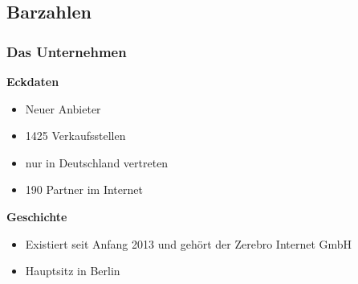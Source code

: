 \subsection{Barzahlen}
\subsubsection{Das Unternehmen}

\textbf{Eckdaten}
\begin{itemize}
\item Neuer Anbieter
\item 1425 Verkaufsstellen
\item nur in Deutschland vertreten
\item 190 Partner im Internet
\end{itemize}
%
%
\textbf{Geschichte}
\begin{itemize}
\item Existiert seit Anfang 2013 und gehört der Zerebro Internet GmbH
\item Hauptsitz in Berlin
\end{itemize}

